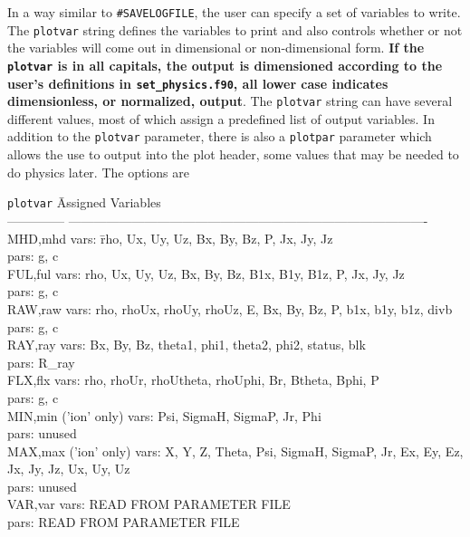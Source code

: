 In a way similar to {\tt \#SAVELOGFILE}, the user
can specify a set of variables to write.
The {\tt plotvar} string defines the variables to print and also
controls whether or not the variables will come out in
dimensional or non-dimensional form.  {\bf If the {\tt plotvar} is in all capitals,
the output is dimensioned according to the user's definitions in 
{\tt set\_physics.f90},
all lower case indicates dimensionless, or normalized, output}. 
The {\tt plotvar} string can have several different values, most of
which assign a predefined list of output variables. In addition
to the {\tt plotvar} parameter, there is also a {\tt plotpar}
parameter which allows the use to output into the plot header,
some values that may be needed to do physics later.  The options are
\begin{tabbing}
{\tt plotvar}     \hspace{1.0in} \=  Assigned Variables \\
-------------- \> ------------------------------------------------------------------------------------- \\
MHD,mhd       \> vars: \=rho, Ux, Uy, Uz, Bx, By, Bz, P, Jx, Jy, Jz \\
              \> pars: \>g, c \\
FUL,ful       \> vars: \>rho, Ux, Uy, Uz, Bx, By, Bz, B1x, B1y, B1z, P, Jx, Jy, Jz \\
              \> pars: \>g, c \\
RAW,raw       \> vars: \>rho, rhoUx, rhoUy, rhoUz, E, Bx, By, Bz, P,
           	      b1x, b1y, b1z, divb \\
              \> pars: \>g, c \\
RAY,ray       \> vars: \>Bx, By, Bz, theta1, phi1, theta2, phi2, status, blk \\
              \> pars: \>R\_ray \\
FLX,flx       \> vars: \>rho, rhoUr, rhoUtheta, rhoUphi, Br, Btheta, Bphi, P \\
              \> pars: \>g, c \\
MIN,min ('ion' only)       \> vars: \>Psi, SigmaH, SigmaP, Jr, Phi \\
              \> pars: unused \\
MAX,max ('ion' only)      \> vars: \>X, Y, Z, Theta, Psi, SigmaH, SigmaP, Jr, Ex, 
                      Ey, Ez, Jx, Jy, Jz, Ux, Uy, Uz \\
              \> pars: unused \\
VAR,var       \> vars: \>READ FROM PARAMETER FILE \\
              \> pars: \>READ FROM PARAMETER FILE
\end{tabbing}

